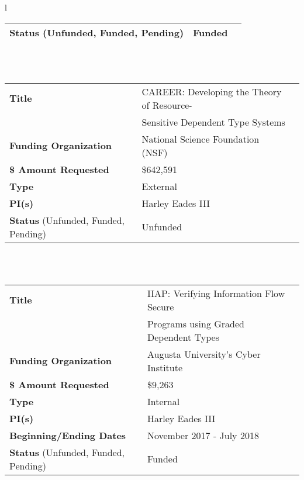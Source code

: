 \documentclass[11pt]{article}
\begin{document}
\begin{tabular}{l}
\begin{tabular}{|l|l|l|}
          \hline
          \textbf{Status} (Unfunded, Funded, Pending) & Funded\\
          \hline
        \end{tabular}\\
        \\
        \begin{tabular}{|l|l|l|}
          \hline
          \textbf{Title} & CAREER: Developing the Theory of Resource-\\
                         & Sensitive Dependent Type Systems \\
          \hline
          \textbf{Funding Organization} & National Science Foundation (NSF)\\
          \hline
          \textbf{\$ Amount Requested} & \$642,591\\
          \hline
          \textbf{Type} & External\\
          \hline
          \textbf{PI(s)} & Harley Eades III\\
          \hline
          \textbf{Status} (Unfunded, Funded, Pending) & Unfunded\\
          \hline
        \end{tabular}\\
        \\
        \begin{tabular}{|l|l|l|}
          \hline
          \textbf{Title} & IIAP: Verifying Information Flow Secure \,\,\,\,\,\,\,\,\,\,\,\,\,\,\, \\
          & Programs using Graded Dependent Types\\
          \hline
          \textbf{Funding Organization} & Augusta University's Cyber Institute\\
          \hline
          \textbf{\$ Amount Requested} & \$9,263\\
          \hline
          \textbf{Type} & Internal\\
          \hline
          \textbf{PI(s)} & Harley Eades III\\
          \hline
          \textbf{Beginning/Ending Dates} & November 2017 - July 2018\\
          \hline
          \textbf{Status} (Unfunded, Funded, Pending) & Funded\\
          \hline
        \end{tabular}\\
        \\        
    \end{tabular}
    \\
\end{document}
